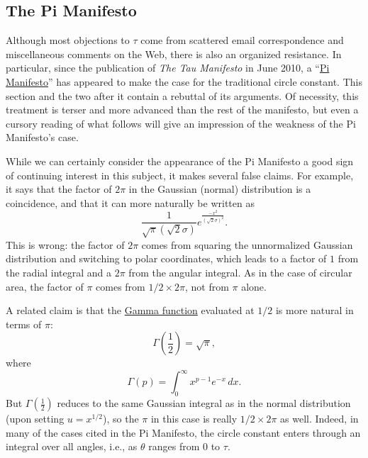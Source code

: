 
  \subsection{The Pi Manifesto} %
  \label{sec:the_pi_manifesto_a_rebuttal}

Although most objections to $\tau$ come from scattered email correspondence and miscellaneous comments on the Web, there is also an organized resistance. In particular, since the publication of \emph{The Tau Manifesto} in June 2010, a ``\href{http://www.thepimanifesto.com/}{Pi Manifesto}'' has appeared to make the case for the traditional circle constant. This section and the two after it contain a rebuttal of its arguments. Of necessity, this treatment is terser and more advanced than the rest of the manifesto, but even a cursory reading of what follows will give an impression of the weakness of the Pi Manifesto's case.

While we can certainly consider the appearance of the Pi Manifesto a good sign of continuing interest in this subject, it makes several false claims. For example, it says that the factor of $2\pi$ in the Gaussian (normal) distribution is a coincidence, and that it can more naturally be written as
\[
\frac{1}{\sqrt\pi(\sqrt 2\sigma)}e^{\frac{-x^2}{(\sqrt 2\sigma)^2}}.
\]
This is wrong: the factor of $2\pi$ comes from squaring the unnormalized Gaussian distribution and switching to polar coordinates, which leads to a factor of $1$ from
the radial integral and a $2\pi$ from the angular integral. As in the case of circular area, the factor
of $\pi$ comes from $1/2\times 2\pi$, not from $\pi$ alone.

A related claim is that the \href{https://mathworld.wolfram.com/GammaFunction.html}{Gamma function} evaluated at $1/2$ is more natural in terms of $\pi$:
\[
\Gamma(\textstyle{\frac{1}{2}}) = \sqrt{\pi},
\]
where
\begin{equation}
\label{eq:gamma}
\Gamma(p) = \int_{0}^{\infty} x^{p-1} e^{-x}\,dx.
\end{equation}
But $\Gamma(\frac{1}{2})$ reduces to the same Gaussian integral as in the normal distribution (upon setting $u =
x^{1/2}$), so the $\pi$ in this case is really $1/2\times 2\pi$ as well. Indeed, in many of the cases cited in the Pi Manifesto,
the circle constant enters through an integral over all angles, i.e.,
as $\theta$ ranges from $0$ to $\tau$.

